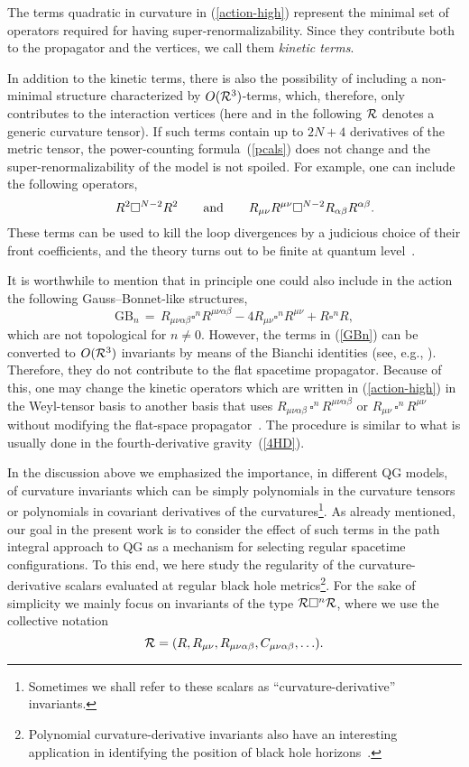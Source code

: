 \documentclass[aps,prd,a4paper,twocolumn,showpacs,showkeys,preprintnumbers,amsmath,amssymb,nofootinbib,usenames,dvipsnames]{revtex4-2}
\newcommand{\be}{\begin{eqnarray}}
\def\beq{\begin{equation}}
\def\eeq{\end{equation}}
\newcommand{\eq}[1]{(\ref{#1})}
\def\al{\alpha}
\def\be{\beta}
\begin{document}
The terms quadratic in curvature in \eq{action-high} represent the minimal set of operators required for having  super-renormalizability. Since they contribute both to the propagator and the vertices, we call them {\it kinetic terms}.

In addition to the kinetic terms, there is also the possibility of including a non-minimal structure characterized by 
$O({\cal R}^3)$-terms, which, therefore, only contributes to the interaction vertices (here and in the following ${\cal R}$ denotes a generic curvature tensor). If such terms contain up to $2N+4$ derivatives of the metric tensor, the power-counting formula~\eq{pcals} does not change and the super-renormalizability of the model is not spoiled.   
For example, one can include the following operators,
\beq 
\hspace{0.6 cm}
 R^2 \Box^{N-2} R^2 \qquad \text{and} \qquad  
R_{\mu\nu} R^{\mu\nu} \Box^{N-2}  R_{\al\be} R^{\al\be}.
\eeq  
These terms can be used to kill the loop divergences by a judicious choice of their front coefficients, 
and the theory turns out to be finite at quantum level~\cite{AsoreyLopezShapiro,Modesto16,Modesto:2014lga,Modesto:2015foa}. 

It is worthwhile to mention that in principle one could also include in the action the following Gauss--Bonnet-like structures, 
\beq
\mathrm{GB}_{n}
\,=\,
R_{\mu\nu\al\be} \square^{n} R^{\mu\nu\al\be}
- 4 R_{\mu\nu} \square^{n} R^{\mu\nu}
+ R \square^{n} R,
\label{GBn}
\eeq 
which are not topological for $n \neq 0$. However, the terms in \eq{GBn} can be converted to $O({\cal R}^3)$ invariants  by means of the Bianchi identities (see, {e.g.}, \cite{AsoreyLopezShapiro,Deser:1986xr}). Therefore, they do not contribute to the flat spacetime propagator. 
Because of this, one may change the kinetic operators which are written in \eq{action-high} in the Weyl-tensor basis to another basis that uses $R_{\mu\nu\al\be}\, \square^n\,R^{\mu\nu\al\be}$ or $R_{\mu\nu}\, \square^n\,R^{\mu\nu}$ without modifying the flat-space propagator~\cite{AsoreyLopezShapiro}. The procedure is similar to what is usually done in the fourth-derivative gravity~\eq{4HD}. 

In the discussion above we emphasized the importance, in different QG models, 
of curvature invariants which can be simply polynomials in the curvature tensors or polynomials in covariant derivatives of the curvatures\footnote{Sometimes we shall refer to these scalars as ``curvature-derivative'' invariants.}.  
%
As already mentioned, our goal in the present work is to consider the effect of such terms in the path integral approach to QG as a mechanism for selecting regular spacetime configurations.
To this end, we here 
study the regularity of the curvature-derivative scalars evaluated at regular black hole metrics\footnote{Polynomial curvature-derivative invariants also have an interesting application in identifying the position of black hole horizons~\cite{Page:2015aia,McNutt:2017gjg,Coley:2017vxb,McNutt:2017paq}.}. 
For the sake of simplicity 
we mainly focus on invariants of the type ${\cal R} \Box^n {\cal R}$, where  we use the collective notation
%
\beq
{\cal R} = ( R, R_{\mu\nu}, R_{\mu\nu\al\be}, C_{\mu\nu\al\be}, \ldots ) .
\eeq
\end{document}
